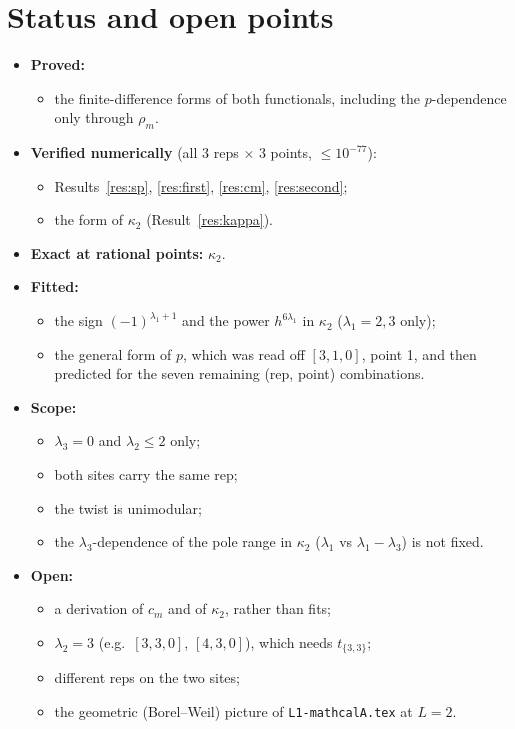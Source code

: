 \documentclass[11pt]{article}
\newcommand{\nb}[1]{\texttt{#1}}
\theoremstyle{definition}
\theoremstyle{remark}
\begin{document}
\section{Status and open points}
\begin{itemize}
\item \textbf{Proved:}
  \begin{itemize}
  \item the finite-difference forms of both functionals, including the $p$-dependence only through $\rho_m$.
  \end{itemize}
\item \textbf{Verified numerically} (all 3 reps $\times$ 3 points, $\le10^{-77}$):
  \begin{itemize}
  \item Results~\ref{res:sp}, \ref{res:first}, \ref{res:cm}, \ref{res:second};
  \item the form of $\kappa_2$ (Result~\ref{res:kappa}).
  \end{itemize}
\item \textbf{Exact at rational points:} $\kappa_2$.
\item \textbf{Fitted:}
  \begin{itemize}
  \item the sign $(-1)^{\lambda_1+1}$ and the power $h^{6\lambda_1}$ in $\kappa_2$ ($\lambda_1=2,3$ only);
  \item the general form of $p$, which was read off $[3,1,0]$, point 1, and then predicted for the seven remaining (rep, point) combinations.
  \end{itemize}
\item \textbf{Scope:}
  \begin{itemize}
  \item $\lambda_3=0$ and $\lambda_2\le2$ only;
  \item both sites carry the same rep;
  \item the twist is unimodular;
  \item the $\lambda_3$-dependence of the pole range in $\kappa_2$ ($\lambda_1$ vs $\lambda_1-\lambda_3$) is not fixed.
  \end{itemize}
\item \textbf{Open:}
  \begin{itemize}
  \item a derivation of $c_m$ and of $\kappa_2$, rather than fits;
  \item $\lambda_2=3$ (e.g.\ $[3,3,0]$, $[4,3,0]$), which needs $t_{\{3,3\}}$;
  \item different reps on the two sites;
  \item the geometric (Borel--Weil) picture of \nb{L1-mathcalA.tex} at $L=2$.
  \end{itemize}
\end{itemize}
\end{document}
